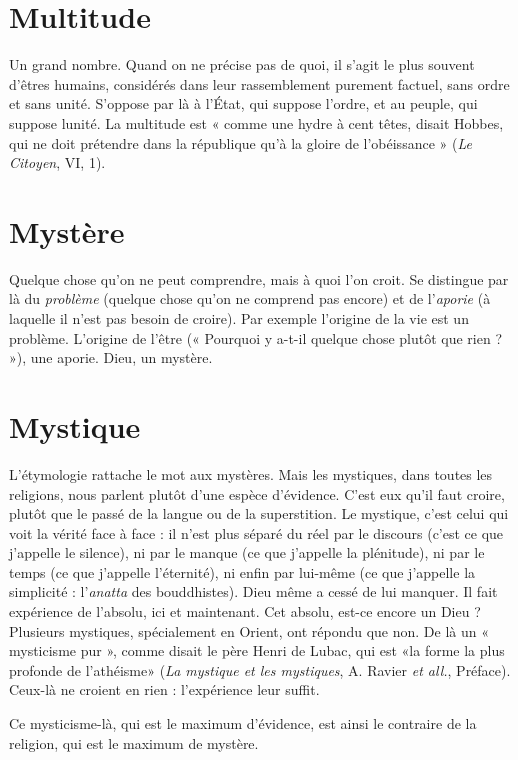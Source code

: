 \section{Multitude}
Un grand nombre. Quand on ne précise pas de quoi, il s’agit
le plus souvent d’êtres humains, considérés dans leur rassemblement
purement factuel, sans ordre et sans unité. S’oppose par là à l'État, qui
suppose l’ordre, et au peuple, qui suppose lunité. La multitude est « comme
une hydre à cent têtes, disait Hobbes, qui ne doit prétendre dans la république
qu’à la gloire de l’obéissance » ({\it Le Citoyen}, VI, 1).

\section{Mystère}
Quelque chose qu’on ne peut comprendre, mais à quoi l’on
croit. Se distingue par là du {\it problème} (quelque chose qu’on ne
comprend pas encore) et de l’{\it aporie} (à laquelle il n’est pas besoin de croire). Par
exemple l’origine de la vie est un problème. L'origine de l’être (« Pourquoi y a-t-il
quelque chose plutôt que rien ? »), une aporie. Dieu, un mystère.

\section{Mystique}
L’étymologie rattache le mot aux mystères. Mais les mystiques,
dans toutes les religions, nous parlent plutôt d’une espèce
d’évidence. C’est eux qu’il faut croire, plutôt que le passé de la langue ou de la
superstition. Le mystique, c’est celui qui voit la vérité face à face : il n’est plus
séparé du réel par le discours (c’est ce que j'appelle le silence), ni par le manque (ce
que j'appelle la plénitude), ni par le temps (ce que j'appelle l'éternité), ni enfin par
lui-même (ce que j'appelle la simplicité : l’{\it anatta} des bouddhistes). Dieu même a
cessé de lui manquer. Il fait expérience de l'absolu, ici et maintenant. Cet absolu,
est-ce encore un Dieu ? Plusieurs mystiques, spécialement en Orient, ont répondu
que non. De là un « mysticisme pur », comme disait le père Henri de Lubac, qui
est «la forme la plus profonde de l’athéisme» ({\it La mystique et les mystiques},
A. Ravier {\it et all.}, Préface). Ceux-là ne croient en rien : l'expérience leur suffit.

Ce mysticisme-là, qui est le maximum d’évidence, est ainsi le contraire de
la religion, qui est le maximum de mystère.

